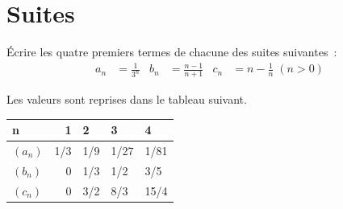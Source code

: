 \documentclass[12pt,french,oneside,a4paper]{memoir} %
\begin{document}
\chapter{Suites}
\begin{exo}
Écrire les quatre premiers termes de chacune des suites suivantes~:
\begin{align*}
  a_{n} &= \frac{1}{3^{n}} & b_{n} &= \frac{n-1}{n+1} & c_{n} &= n - \frac{1}{n} \; (n > 0)
\end{align*}

\begin{correction}
Les valeurs sont reprises dans le tableau suivant.
\begin{tabular}{lrlll}
n & 1 & 2 & 3 & 4\\
\hline
\((a_n)\) & 1/3 & 1/9 & 1/27 & 1/81\\
\((b_n)\) & 0 & 1/3 & 1/2 & 3/5\\
\((c_n)\) & 0 & 3/2 & 8/3 & 15/4\\
\end{tabular}
\end{correction}
\end{exo}
\end{document}
